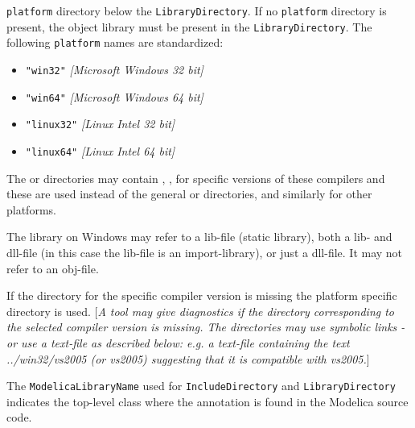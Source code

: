\begin{itemize}
  \lstinline!platform! directory below the \lstinline!LibraryDirectory!. If no
  \lstinline!platform! directory is present, the object library must be present
  in the \lstinline!LibraryDirectory!. The following \lstinline!platform! names are
  standardized:
  \begin{itemize}
  \item
    \lstinline!"win32"! \emph{{[}Microsoft Windows 32 bit{]}}
  \item
    \lstinline!"win64"! \emph{{[}Microsoft Windows 64 bit{]}}
  \item
    \lstinline!"linux32"! \emph{{[}Linux Intel 32 bit{]}}
  \item
    \lstinline!"linux64"! \emph{{[}Linux Intel 64 bit{]}}
  \end{itemize}
\end{itemize}

The  or  directories may contain , , 
for specific versions of these compilers and these are used instead of
the general  or  directories, and similarly for other
platforms.

The library on Windows may refer to a lib-file (static library), both a lib- and dll-file (in this case the lib-file is an import-library),
or just a dll-file. It may not refer to an obj-file.

If the directory for the specific compiler version is missing the
platform specific directory is used. {[}\emph{A tool may give
diagnostics if the directory corresponding to the selected compiler
version is missing. The directories may use symbolic links - or use a
text-file as described below: e.g. a text-file  containing the
text \emph{../win32/vs2005} (or \emph{vs2005}) suggesting that it is compatible
with vs2005.}{]}

The \lstinline!ModelicaLibraryName! used for \lstinline!IncludeDirectory! and \lstinline!LibraryDirectory!
indicates the top-level class where the annotation is found in the
Modelica source code.

